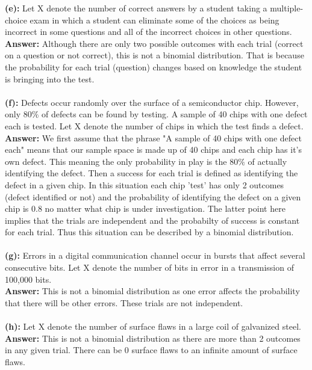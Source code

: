 \documentclass[11pt]{article}
\begin{document}
\textbf{(e):} Let X denote the number of correct answers by a student taking a multiple-choice exam in which a student can eliminate some of the choices as being incorrect in some questions and all of the incorrect choices in other questions.
\\\textbf{Answer: } Although there are only two possible outcomes with each trial (correct on a question or not correct), this is not a binomial distribution. That is because the probability for each trial (question) changes based on knowledge the student is bringing into the test. \\\\
\textbf{(f):} Defects occur randomly over the surface of a semiconductor chip. However, only 80$\%$ of defects can be found by testing. A sample of 40 chips with one defect each is tested. Let X denote the number of chips in which the test finds a defect.
\\\textbf{Answer: } We first assume that the phrase "A sample of 40 chips with one defect each" means that our sample space is made up of 40 chips and each chip has it's own defect. This meaning the only probability in play is the 80$\%$ of actually identifying the defect. Then a success for each trial is defined as identifying the defect in a given chip. In this situation each chip 'test' has only 2 outcomes (defect identified or not) and the probability of identifying the defect on a given chip is 0.8 no matter what chip is under investigation. The latter point here implies that the trials are independent and the probabilty of success is constant for each trial. Thus this situation can be described by a binomial distribution.\\\\
\textbf{(g):} Errors in a digital communication channel occur in bursts that affect several consecutive bits. Let X denote the number of bits in error in a transmission of 100,000 bits.
\\\textbf{Answer: } This is not a binomial distribution as one error affects the probability that there will be other errors. These trials are not independent.\\\\
\textbf{(h):} Let X denote the number of surface flaws in a large coil of galvanized steel.
\\\textbf{Answer: } This is not a binomial distribution as there are more than 2 outcomes in any given trial. There can be 0 surface flaws to an infinite amount of surface flaws.\\\\\\
\end{document}
